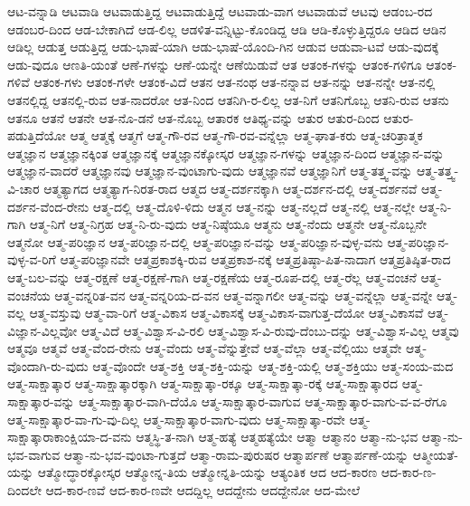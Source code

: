 {ಆಟ-ವನ್ನಾಡಿ
ಆಟವಾಡಿ
ಆಟವಾಡುತ್ತಿದ್ದ
ಆಟವಾಡುತ್ತಿದ್ದೆ
ಆಟವಾಡು-ವಾಗ
ಆಟವಾಡುವೆ
ಆಟವು
ಆಡಂಬ-ರದ
ಆಡಂಬರ-ದಿಂದ
ಆಡ-ಬೇಕಾಗಿದೆ
ಆಡ-ಲಿಲ್ಲ
ಆಡಳಿತ-ವನ್ನಿಟ್ಟು-ಕೊಂಡಿದ್ದ
ಆಡಿ
ಆಡಿ-ಕೊಳ್ಳುತ್ತಿದ್ದರೂ
ಆಡಿದ
ಆಡಿನ
ಆಡಿಲ್ಲ
ಆಡುತ್ತ
ಆಡುತ್ತಿದ್ದ
ಆಡು-ಭಾಷೆ-ಯಾಗಿ
ಆಡು-ಭಾಷೆ-ಯೊಂದಿ-ಗಿನ
ಆಡುವ
ಆಡುವಾ-ಟವೆ
ಆಡು-ವುದಕ್ಕೆ
ಆಡು-ವುದೂ
ಆಣತಿ-ಯಂತೆ
ಆಣೆ-ಗಳನ್ನು
ಆಣೆ-ಯನ್ನೇ
ಆಣೆಯಿಡುವೆ
ಆತ
ಆತಂಕ-ಗಳನ್ನು
ಆತಂಕ-ಗಳಿಗೂ
ಆತಂಕ-ಗಳಿವೆ
ಆತಂಕ-ಗಳು
ಆತಂಕ-ಗಳೇ
ಆತಂಕ-ವಿದೆ
ಆತನ
ಆತ-ನಂಥ
ಆತ-ನನ್ನಾವ
ಆತ-ನನ್ನು
ಆತ-ನನ್ನೇ
ಆತ-ನಲ್ಲಿ
ಆತನಲ್ಲಿದ್ದ
ಆತನಲ್ಲಿ-ರುವ
ಆತ-ನಾದರೋ
ಆತ-ನಿಂದ
ಆತನಿಗಿ-ರ-ಲಿಲ್ಲ
ಆತ-ನಿಗೆ
ಆತನಿಗೊಬ್ಬ
ಆತನಿ-ರುವ
ಆತನು
ಆತನೂ
ಆತನೆ
ಆತನೇ
ಆತ-ನೊ-ಡನೆ
ಆತ-ನೊಬ್ಬ
ಆತಾರಕ
ಆತಿಥ್ಯ-ವನ್ನು
ಆತುರ
ಆತುರ-ದಿಂದ
ಆತುರ-ಪಡುತ್ತಿದೆಯೋ
ಆತ್ಮ
ಆತ್ಮಕ್ಕೆ
ಆತ್ಮಗೆ
ಆತ್ಮ-ಗೌ-ರವ
ಆತ್ಮ-ಗೌ-ರವ-ವನ್ನೆಲ್ಲಾ
ಆತ್ಮ-ಘಾತ-ಕರು
ಆತ್ಮ-ಚರಿತ್ರಾತ್ಮಕ
ಆತ್ಮಜ್ಞಾನ
ಆತ್ಮಜ್ಞಾನಕ್ಕಿಂತ
ಆತ್ಮಜ್ಞಾನಕ್ಕೆ
ಆತ್ಮಜ್ಞಾನಕ್ಕೋಸ್ಕರ
ಆತ್ಮಜ್ಞಾನ-ಗಳನ್ನು
ಆತ್ಮಜ್ಞಾನ-ದಿಂದ
ಆತ್ಮಜ್ಞಾನ-ವನ್ನು
ಆತ್ಮಜ್ಞಾನ-ವಾದರೆ
ಆತ್ಮಜ್ಞಾನವು
ಆತ್ಮಜ್ಞಾನ-ವುಂಟಾಗು-ವುದು
ಆತ್ಮಜ್ಞಾನವೆ
ಆತ್ಮಜ್ಞಾನಿಗೆ
ಆತ್ಮ-ತತ್ತ್ವ-ವನ್ನು
ಆತ್ಮ-ತತ್ತ್ವ-ವಿ-ಚಾರ
ಆತ್ಮತ್ಯಾಗದ
ಆತ್ಮತ್ಯಾಗ-ನಿರತ-ರಾದ
ಆತ್ಮದ
ಆತ್ಮ-ದರ್ಶನಕ್ಕಾಗಿ
ಆತ್ಮ-ದರ್ಶನ-ದಲ್ಲಿ
ಆತ್ಮ-ದರ್ಶನವೆ
ಆತ್ಮ-ದರ್ಶನ-ವೆಂದ-ರೇನು
ಆತ್ಮ-ದಲ್ಲಿ
ಆತ್ಮ-ದೊಳಿ-ಳಿದು
ಆತ್ಮನ
ಆತ್ಮ-ನನ್ನು
ಆತ್ಮ-ನಲ್ಲದೆ
ಆತ್ಮ-ನಲ್ಲಿ
ಆತ್ಮ-ನಲ್ಲೇ
ಆತ್ಮ-ನಿ-ಗಾಗಿ
ಆತ್ಮ-ನಿಗೆ
ಆತ್ಮ-ನಿಗ್ರಹ
ಆತ್ಮ-ನಿ-ರು-ವುದು
ಆತ್ಮ-ನಿಷ್ಠೆಯೂ
ಆತ್ಮನು
ಆತ್ಮ-ನೆಂದು
ಆತ್ಮನೇ
ಆತ್ಮ-ನೊಬ್ಬನೇ
ಆತ್ಮನೋ
ಆತ್ಮ-ಪರಿಜ್ಞಾನ
ಆತ್ಮ-ಪರಿಜ್ಞಾನ-ದಲ್ಲಿ
ಆತ್ಮ-ಪರಿಜ್ಞಾನ-ವನ್ನು
ಆತ್ಮ-ಪರಿಜ್ಞಾನ-ವುಳ್ಳ-ವನು
ಆತ್ಮ-ಪರಿಜ್ಞಾನ-ವುಳ್ಳ-ವ-ರಿಗೆ
ಆತ್ಮ-ಪರಿಜ್ಞಾನವೇ
ಆತ್ಮಪ್ರಕಾಶಕ್ಕಿ-ರುವ
ಆತ್ಮಪ್ರಕಾಶ-ನಕ್ಕೆ
ಆತ್ಮಪ್ರತಿಷ್ಠಾ-ಪಿತ-ನಾದಾಗ
ಆತ್ಮಪ್ರತಿಷ್ಠಿತ-ರಾದ
ಆತ್ಮ-ಬಲ-ವನ್ನು
ಆತ್ಮ-ರಕ್ಷಣೆ
ಆತ್ಮ-ರಕ್ಷಣೆ-ಗಾಗಿ
ಆತ್ಮ-ರಕ್ಷಣೆಯ
ಆತ್ಮ-ರೂಪ-ದಲ್ಲಿ
ಆತ್ಮ-ರೆಲ್ಲ
ಆತ್ಮ-ವಂಚನೆ
ಆತ್ಮ-ವಂಚನೆಯ
ಆತ್ಮ-ವನ್ನರಿತ-ವನ
ಆತ್ಮ-ವನ್ನರಿಯ-ದ-ವನ
ಆತ್ಮ-ವನ್ನಾಗಲೀ
ಆತ್ಮ-ವನ್ನು
ಆತ್ಮ-ವನ್ನೆಲ್ಲಾ
ಆತ್ಮ-ವನ್ನೇ
ಆತ್ಮ-ವಲ್ಲ
ಆತ್ಮ-ವಸ್ತುವು
ಆತ್ಮ-ವಾ-ರಿಗೆ
ಆತ್ಮ-ವಿಕಾಸ
ಆತ್ಮ-ವಿಕಾಸಕ್ಕೆ
ಆತ್ಮ-ವಿಕಾಸ-ವಾಗುತ್ತ-ದೆಯೋ
ಆತ್ಮ-ವಿಕಾಸವೆ
ಆತ್ಮ-ವಿಜ್ಞಾನ-ವಿಲ್ಲವೋ
ಆತ್ಮ-ವಿದೆ
ಆತ್ಮ-ವಿಶ್ವಾಸ-ವಿ-ರಲಿ
ಆತ್ಮ-ವಿಶ್ವಾಸ-ವಿ-ರುವು-ದೆಂಬು-ದನ್ನು
ಆತ್ಮ-ವಿಶ್ವಾಸ-ವಿಲ್ಲ
ಆತ್ಮವು
ಆತ್ಮವೂ
ಆತ್ಮವೆ
ಆತ್ಮ-ವೆಂದ-ರೇನು
ಆತ್ಮ-ವೆಂದು
ಆತ್ಮ-ವೆನ್ನುತ್ತೇವೆ
ಆತ್ಮ-ವೆಲ್ಲಾ
ಆತ್ಮ-ವೆಲ್ಲಿಯು
ಆತ್ಮವೇ
ಆತ್ಮ-ವೊಂದಾಗಿ-ರು-ವುದು
ಆತ್ಮ-ವೊಂದೇ
ಆತ್ಮ-ಶಕ್ತಿ
ಆತ್ಮ-ಶಕ್ತಿ-ಯನ್ನು
ಆತ್ಮ-ಶಕ್ತಿ-ಯಲ್ಲಿ
ಆತ್ಮ-ಶಕ್ತಿಯು
ಆತ್ಮ-ಸಂಯ-ಮದ
ಆತ್ಮ-ಸಾಕ್ಷಾತ್ಕಾರ
ಆತ್ಮ-ಸಾಕ್ಷಾತ್ಕಾರಕ್ಕಾಗಿ
ಆತ್ಮ-ಸಾಕ್ಷಾತ್ಕಾ-ರಕ್ಕೂ
ಆತ್ಮ-ಸಾಕ್ಷಾತ್ಕಾ-ರಕ್ಕೆ
ಆತ್ಮ-ಸಾಕ್ಷಾತ್ಕಾರದ
ಆತ್ಮ-ಸಾಕ್ಷಾತ್ಕಾರ-ವನ್ನು
ಆತ್ಮ-ಸಾಕ್ಷಾತ್ಕಾರ-ವಾಗಿ-ದೆಯೊ
ಆತ್ಮ-ಸಾಕ್ಷಾತ್ಕಾರ-ವಾಗುವ
ಆತ್ಮ-ಸಾಕ್ಷಾತ್ಕಾರ-ವಾಗು-ವ-ವ-ರೆಗೂ
ಆತ್ಮ-ಸಾಕ್ಷಾತ್ಕಾರ-ವಾ-ಗು-ವು-ದಿಲ್ಲ
ಆತ್ಮ-ಸಾಕ್ಷಾತ್ಕಾರ-ವಾಗು-ವುದು
ಆತ್ಮ-ಸಾಕ್ಷಾತ್ಕಾ-ರವೇ
ಆತ್ಮ-ಸಾಕ್ಷಾತ್ಕಾರಾಕಾಂಕ್ಷಿಯಾ-ದ-ವನು
ಆತ್ಮಸ್ಥಿ-ತ-ನಾಗಿ
ಆತ್ಮ-ಹತ್ಯೆ
ಆತ್ಮಹತ್ಯೆಯೇ
ಆತ್ಮಾ
ಆತ್ಮಾನಂ
ಆತ್ಮಾ-ನು-ಭವ
ಆತ್ಮಾ-ನು-ಭವ-ವಾಗುವ
ಆತ್ಮಾ-ನು-ಭವ-ವುಂಟಾ-ಗುತ್ತದೆ
ಆತ್ಮಾ-ರಾಮ-ಪುರುಷರ
ಆತ್ಮಾರ್ಪಣೆ
ಆತ್ಮಾರ್ಪಣೆ-ಯನ್ನು
ಆತ್ಮೀಯತೆ-ಯನ್ನು
ಆತ್ಮೋದ್ಧಾರಕ್ಕೋಸ್ಕರ
ಆತ್ಮೋನ್ನ-ತಿಯ
ಆತ್ಮೋನ್ನತಿ-ಯನ್ನು
ಆತ್ಯಂತಿಕ
ಆದ
ಆದ-ಕಾರಣ
ಆದ-ಕಾರ-ಣ-ದಿಂದಲೇ
ಆದ-ಕಾರ-ಣವೆ
ಆದ-ಕಾರ-ಣವೇ
ಆದದ್ದಿಲ್ಲ
ಆದದ್ದೇನು
ಆದದ್ದೇನೋ
ಆದ-ಮೇಲೆ
}
